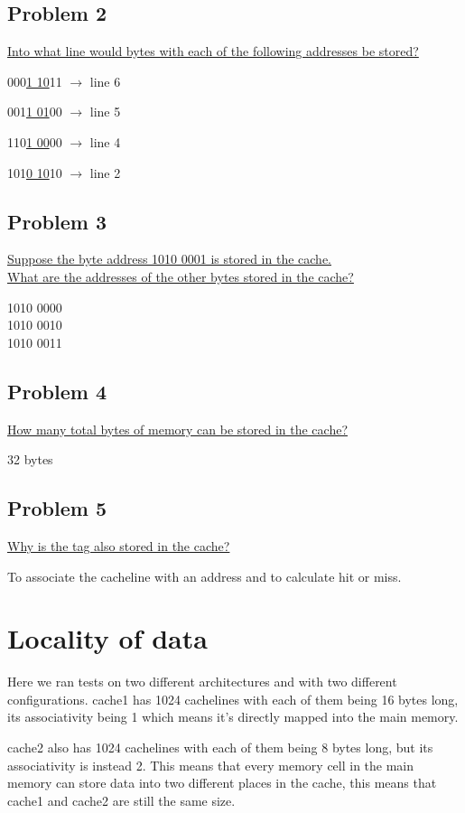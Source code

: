 \documentclass[titlepage, a4paper]{article}
\begin{document}
\subsection{Problem 2}
\underline{Into what line would bytes with each of the following addresses be stored?}

000\underline{1 10}11 $\to$ line 6

001\underline{1 01}00 $\to$ line 5

110\underline{1 00}00 $\to$ line 4

101\underline{0 10}10 $\to$ line 2

\subsection{Problem 3}
\underline{Suppose the byte address 1010 0001 is stored in the cache.} \\
\underline{What are the addresses of the other bytes stored in the cache?}

1010 0000 \\
1010 0010 \\
1010 0011 \\

\subsection{Problem 4}
\underline{How many total bytes of memory can be stored in the cache?}

32 bytes

\subsection{Problem 5}
\underline{Why is the tag also stored in the cache?}

To associate the cacheline with an address and to calculate hit or miss.

\section{Locality of data}
Here we ran tests on two different architectures and with two different configurations.
cache1 has 1024 cachelines with each of them being 16 bytes long, its associativity being 1 which means it's directly mapped into the main memory.

cache2 also has 1024 cachelines with each of them being 8 bytes long, but its associativity is instead 2. This means that every memory cell in the main memory can store data into two different places in the cache, this means that cache1 and cache2 are still the same size.
\end{document}

